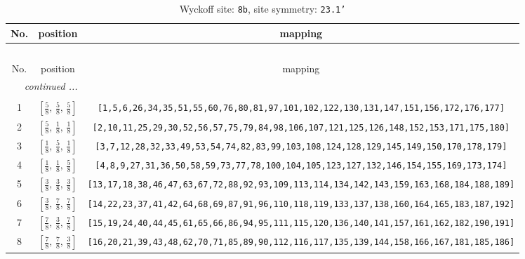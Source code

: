 \documentclass[fleqn,8pt]{jsarticle}
\begin{document}
\renewcommand{\arraystretch}{1.2}
\begin{longtable}{ccc}
\caption{Wyckoff site: {\tt 8b}, site symmetry: {\tt 23.1'}}
 \\
 \hline \hline
No. & position & mapping \\ \hline \endfirsthead

\multicolumn{2}{l}{\tablename\ \thetable{}} \\
 \hline \hline
No. & position & mapping \\ \hline \endhead

 \hline \hline
\multicolumn{2}{r}{\footnotesize\it continued ...} \\ \endfoot

 \hline \hline
\multicolumn{2}{r}{} \\ \endlastfoot

1 & $\left[ \frac{5}{8},\, \frac{5}{8},\, \frac{5}{8} \right]$ & {\tt [1,5,6,26,34,35,51,55,60,76,80,81,97,101,102,122,130,131,147,151,156,172,176,177]} \\ \hline
2 & $\left[ \frac{5}{8},\, \frac{1}{8},\, \frac{1}{8} \right]$ & {\tt [2,10,11,25,29,30,52,56,57,75,79,84,98,106,107,121,125,126,148,152,153,171,175,180]} \\ \hline
3 & $\left[ \frac{1}{8},\, \frac{5}{8},\, \frac{1}{8} \right]$ & {\tt [3,7,12,28,32,33,49,53,54,74,82,83,99,103,108,124,128,129,145,149,150,170,178,179]} \\ \hline
4 & $\left[ \frac{1}{8},\, \frac{1}{8},\, \frac{5}{8} \right]$ & {\tt [4,8,9,27,31,36,50,58,59,73,77,78,100,104,105,123,127,132,146,154,155,169,173,174]} \\ \hline
5 & $\left[ \frac{3}{8},\, \frac{3}{8},\, \frac{3}{8} \right]$ & {\tt [13,17,18,38,46,47,63,67,72,88,92,93,109,113,114,134,142,143,159,163,168,184,188,189]} \\ \hline
6 & $\left[ \frac{3}{8},\, \frac{7}{8},\, \frac{7}{8} \right]$ & {\tt [14,22,23,37,41,42,64,68,69,87,91,96,110,118,119,133,137,138,160,164,165,183,187,192]} \\ \hline
7 & $\left[ \frac{7}{8},\, \frac{3}{8},\, \frac{7}{8} \right]$ & {\tt [15,19,24,40,44,45,61,65,66,86,94,95,111,115,120,136,140,141,157,161,162,182,190,191]} \\ \hline
8 & $\left[ \frac{7}{8},\, \frac{7}{8},\, \frac{3}{8} \right]$ & {\tt [16,20,21,39,43,48,62,70,71,85,89,90,112,116,117,135,139,144,158,166,167,181,185,186]} \\
\end{longtable}
\renewcommand{\arraystretch}{1.2}
\end{document}
